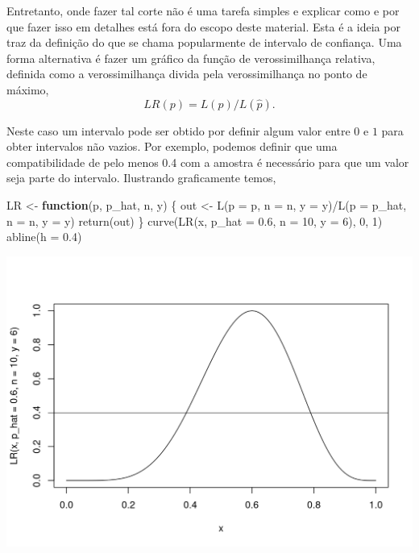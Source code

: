 \documentclass[
  10pt,
  a4paper]{book}
\newenvironment{Shaded}{\begin{snugshade}}{\end{snugshade}}
\newcommand{\AttributeTok}[1]{\textcolor[rgb]{0.77,0.63,0.00}{#1}}
\newcommand{\ControlFlowTok}[1]{\textcolor[rgb]{0.13,0.29,0.53}{\textbf{#1}}}
\newcommand{\DecValTok}[1]{\textcolor[rgb]{0.00,0.00,0.81}{#1}}
\newcommand{\FloatTok}[1]{\textcolor[rgb]{0.00,0.00,0.81}{#1}}
\newcommand{\FunctionTok}[1]{\textcolor[rgb]{0.00,0.00,0.00}{#1}}
\newcommand{\NormalTok}[1]{#1}
\newcommand{\OtherTok}[1]{\textcolor[rgb]{0.56,0.35,0.01}{#1}}
\newcommand{\SpecialCharTok}[1]{\textcolor[rgb]{0.00,0.00,0.00}{#1}}
\begin{document}
Entretanto, onde fazer tal corte não é uma tarefa simples e explicar como e por que fazer isso em detalhes está fora do escopo deste material. Esta é a ideia por traz da definição do que se chama popularmente de intervalo de confiança.
Uma forma alternativa é fazer um gráfico da função de verossimilhança relativa, definida como a verossimilhança divida pela verossimilhança no ponto de máximo,
\[
LR(p) = L(p)/L(\hat{p}).
\]

Neste caso um intervalo pode ser obtido por definir algum valor entre \(0\) e \(1\) para obter intervalos não vazios. Por exemplo, podemos definir que uma compatibilidade de pelo menos 0.4 com a amostra é necessário para que um valor seja parte do intervalo. Ilustrando graficamente temos,

\begin{Shaded}
\begin{Highlighting}[]
\NormalTok{LR }\OtherTok{\textless{}{-}} \ControlFlowTok{function}\NormalTok{(p, p\_hat, n, y) \{}
\NormalTok{  out }\OtherTok{\textless{}{-}} \FunctionTok{L}\NormalTok{(}\AttributeTok{p =}\NormalTok{ p, }\AttributeTok{n =}\NormalTok{ n, }\AttributeTok{y =}\NormalTok{ y)}\SpecialCharTok{/}\FunctionTok{L}\NormalTok{(}\AttributeTok{p =}\NormalTok{ p\_hat, }\AttributeTok{n =}\NormalTok{ n, }\AttributeTok{y =}\NormalTok{ y)}
  \FunctionTok{return}\NormalTok{(out)}
\NormalTok{\}}
\FunctionTok{curve}\NormalTok{(}\FunctionTok{LR}\NormalTok{(x, }\AttributeTok{p\_hat =} \FloatTok{0.6}\NormalTok{, }\AttributeTok{n =} \DecValTok{10}\NormalTok{, }\AttributeTok{y =} \DecValTok{6}\NormalTok{), }\DecValTok{0}\NormalTok{, }\DecValTok{1}\NormalTok{)}
\FunctionTok{abline}\NormalTok{(}\AttributeTok{h =} \FloatTok{0.4}\NormalTok{)}
\end{Highlighting}
\end{Shaded}

\begin{center}\includegraphics{figures/unnamed-chunk-377-1} \end{center}
\end{document}
